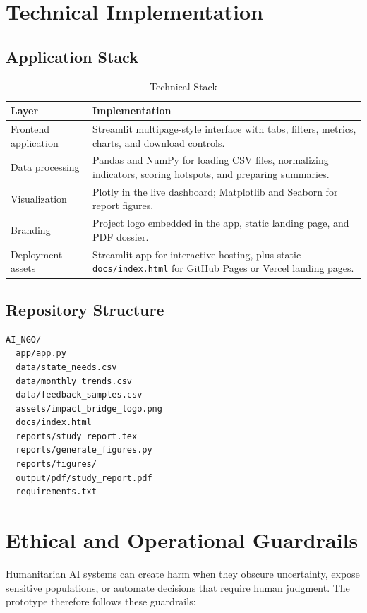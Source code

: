 \documentclass[11pt,a4paper]{article}
\begin{document}
\section{Technical Implementation}

\subsection{Application Stack}

\begin{table}[H]
\centering
\caption{Technical Stack}
\begin{tabularx}{\textwidth}{p{}Y}
\toprule
\textbf{Layer} & \textbf{Implementation} \\
\midrule
Frontend application & Streamlit multipage-style interface with tabs, filters, metrics, charts, and download controls. \\
Data processing & Pandas and NumPy for loading CSV files, normalizing indicators, scoring hotspots, and preparing summaries. \\
Visualization & Plotly in the live dashboard; Matplotlib and Seaborn for report figures. \\
Branding & Project logo embedded in the app, static landing page, and PDF dossier. \\
Deployment assets & Streamlit app for interactive hosting, plus static \texttt{docs/index.html} for GitHub Pages or Vercel landing pages. \\
\bottomrule
\end{tabularx}
\end{table}

\subsection{Repository Structure}

\begin{verbatim}
AI_NGO/
  app/app.py
  data/state_needs.csv
  data/monthly_trends.csv
  data/feedback_samples.csv
  assets/impact_bridge_logo.png
  docs/index.html
  reports/study_report.tex
  reports/generate_figures.py
  reports/figures/
  output/pdf/study_report.pdf
  requirements.txt
\end{verbatim}

\section{Ethical and Operational Guardrails}

Humanitarian AI systems can create harm when they obscure uncertainty, expose sensitive populations, or automate decisions that require human judgment. The prototype therefore follows these guardrails:
\end{document}
